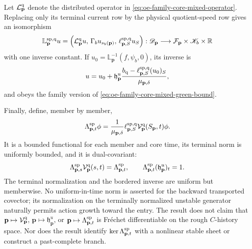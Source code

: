 \begin{theorem}
Let \(\mathcal L_{\mathbf p}^{\rm q}\) denote the distributed operator
in \cref{eq:oe-family-core-mixed-operator}.  Replacing only its terminal
current row by the physical quotient-speed row gives an isomorphism
\begin{equation}
 \mathbb L_{\mathbf p}^{\rm sp,q}u
 =\left(\mathcal L_{\mathbf p}^{\rm q}u,\,
        \Gamma_bu_{s_b(\mathbf p)},\,
        \ell_{\mathbf p,S}^{\rm sp,q}u_S\right):
 \mathscr D_{\mathbf p}\longrightarrow
 \mathcal F_{\mathbf p}\times\mathscr K_b\times\mathbb R
                                                        \label{eq:oe-family-speed-bordered-operator}
\end{equation}
with one inverse constant.  If
\(u_0=\mathbb L_{\mathbf p}^{-1}(f,\psi_b,0)\), its inverse is
\begin{equation}
 u=u_0+\mathfrak h_{\mathbf p}^u
 \frac{b_{\rm q}
       -\ell_{\mathbf p,S}^{\rm sp,q}(u_0)_S}
      {\mu_{\mathbf p,\delta}},                 \label{eq:oe-family-speed-bordered-inverse}
\end{equation}
and obeys the family version of
\cref{eq:oe-family-core-mixed-green-bound}.

Finally, define, member by member,
\begin{equation}
 \Lambda_{\mathbf p,t}^{\rm sp}\phi
 =\frac1{\mu_{\mathbf p,\delta}}
   \ell_{\mathbf p,S}^{\rm sp,q}
     \mathcal V_{\mathbf p}^{\rm q}(S_{\mathbf p},t)\phi.
                                                        \label{eq:oe-family-speed-conormal}
\end{equation}
It is a bounded functional for each member and core time, its terminal
norm is uniformly bounded, and it is dual-covariant:
\begin{equation}
 \Lambda_{\mathbf p,s}^{\rm sp}
       \mathcal V_{\mathbf p}^{\rm q}(s,t)
 =\Lambda_{\mathbf p,t}^{\rm sp},\qquad
 \Lambda_{\mathbf p,t}^{\rm sp}
       (\mathfrak h_{\mathbf p}^u)_t=1.         \label{eq:oe-family-speed-conormal-identities}
\end{equation}
The terminal normalization and the bordered inverse are uniform but
memberwise.  No uniform-in-time norm is asserted for the backward
transported covector; its normalization on the terminally normalized
unstable generator naturally permits action growth toward the entry.
The result does not claim that
\(\mathbf p\mapsto\mathcal V_{\mathbf p}^{\rm q}\),
\(\mathbf p\mapsto\mathfrak h_{\mathbf p}^u\), or
\(\mathbf p\mapsto\Lambda_{\mathbf p,t}^{\rm sp}\) is Fr\'{e}chet
differentiable on the rough \(C\)-history space.  Nor does the result
identify \(\ker\Lambda_{\mathbf p,t}^{\rm sp}\) with a nonlinear stable
sheet or construct a past-complete branch.
\end{theorem}

